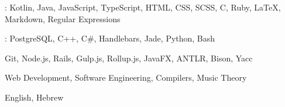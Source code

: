 
\begin{cvparagraph}
    : Kotlin, Java, JavaScript, TypeScript, HTML, CSS, SCSS, C, Ruby, LaTeX, Markdown, Regular Expressions

    : PostgreSQL, C++, C\#, Handlebars, Jade, Python, Bash

     Git, Node.js, Rails, Gulp.js, Rollup.js, JavaFX, ANTLR, Bison, Yacc

     Web Development, Software Engineering, Compilers, Music Theory

     English, Hebrew
\end{cvparagraph}
